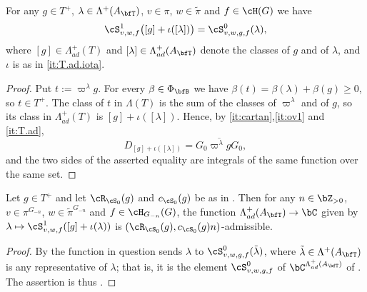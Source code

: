 \documentclass[12pt,a4paper]{amsart}%
\newcommand{\claude}[1]{{{#1}}}
\begin{document}
\begin{lemma}\label{lem:S1.S0}
    For any $g\in T^+$, $\lambda\in \Lambda^+(A_{\bfT})$, $v\in \pi$, $w\in \tilde\pi$ and $f\in \cH(G)$ we have
    $$\cS^1_{v,w,f}\bigl([g]+\iota([\lambda])\bigr)=\cS^0_{v,w,g,f}(\lambda),$$
    where $[g]\in \Lambda^+_{ad}(T)$ and $[\lambda]\in \Lambda^+_{ad}(A_{\bfT})$ denote the classes of $g$ and of $\lambda$, and $\iota$ is as in \claude{\eqref{it:T.ad.iota}}.
\end{lemma}
\begin{proof}
Put $t:=\varpi^\lambda g$. For every $\beta\in \Phi_\bfB$ we have $\beta(t)=\beta(\lambda)+\beta(g)\geq 0$, so $t\in T^+$. The class of $t$ in $\Lambda(T)$ is the sum of the classes of $\varpi^\lambda$ and of $g$, so its class in $\Lambda^+_{ad}(T)$ is $[g]+\iota([\lambda])$. Hence, by \eqref{it:cartan},\eqref{it:ov1} and \eqref{it:T.ad},
$$D_{[g]+\iota([\lambda])}=\overline{G_0\varpi^{\lambda}gG_0} ,$$
and the two sides of the asserted equality are integrals of the same function over the same set.
\end{proof}

\begin{cor}\label{cor:S1.coset}
    Let $g\in T^+$ and let $\cR_{\cS_0}(g)$ and $c_{\cS_0}(g)$ be as in . Then for any $n\in \Z_{>0}$, $v\in \pi^{G_{-n}}$, $w\in \tilde\pi^{G_{-n}}$ and $f\in \cH_{G_{-n}}(G)$, the function $\Lambda^+_{ad}(A_{\bfT})\to \C$ given by $\lambda\mapsto \cS^1_{v,w,f}([g]+\iota(\lambda))$ is $(\cR_{\cS_0}(g),c_{\cS_0}(g)n)$-admissible.
\end{cor}
\begin{proof}
By  the function in question sends $\lambda$ to $\cS^0_{v,w,g,f}(\tilde \lambda)$, where $\tilde\lambda\in \Lambda^+(A_\bfT)$ is any representative of $\lambda$; that is, it is the element $\cS^0_{v,w,g,f}$ of $\C^{\Lambda^+_{ad}(A_\bfT)}$ of . The assertion is thus .
\end{proof}
\end{document}
